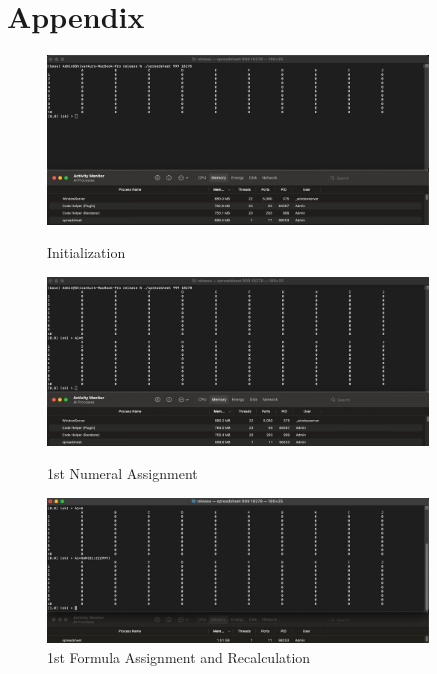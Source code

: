 \documentclass[10pt,a4paper]{article}  %
\begin{document}
\section{Appendix}
\begin{figure}[h!]
    \centering
    \begin{minipage}{0.3\textwidth}
        \centering
        \includegraphics[width=0.9\textwidth]{init.jpeg}
        \caption{Initialization}
        \label{fig:init}
    \end{minipage}\hfill
    \begin{minipage}{0.3\textwidth}
        \centering
        \includegraphics[width=0.9\textwidth]{1num.jpeg}
        \caption{1st Numeral Assignment}
        \label{fig:1num}
    \end{minipage}\hfill
    \begin{minipage}{0.3\textwidth}
        \centering
        \includegraphics[width=0.9\textwidth]{1for.jpeg}
        \caption{1st Formula Assignment and Recalculation}
        \label{fig:1for}
    \end{minipage}
\end{figure}
\end{document}
